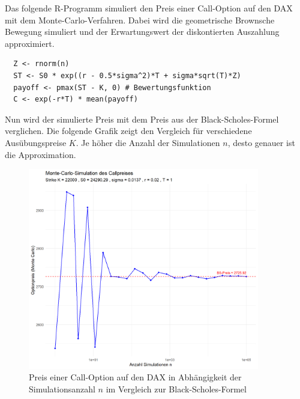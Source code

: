 \begin{bsp}

Das folgende R-Programm simuliert den Preis einer Call-Option auf den DAX
mit dem Monte-Carlo-Verfahren. Dabei wird die geometrische Brownsche Bewegung
simuliert und der Erwartungswert der diskontierten Auszahlung approximiert.

\begin{lstlisting}
  Z <- rnorm(n)
  ST <- S0 * exp((r - 0.5*sigma^2)*T + sigma*sqrt(T)*Z)
  payoff <- pmax(ST - K, 0) # Bewertungsfunktion
  C <- exp(-r*T) * mean(payoff)
\end{lstlisting}
Nun wird der simulierte Preis mit dem Preis aus der Black-Scholes-Formel verglichen. 
Die folgende Grafik zeigt den Vergleich für verschiedene Ausübungspreise $K$.
Je höher die Anzahl der Simulationen $n$, desto genauer ist die Approximation.

\begin{figure}[H]
    \centering
    \includegraphics[width=0.9\textwidth]{images/call_dax_mc.png}
    \caption{Preis einer Call-Option auf den DAX in Abhängigkeit der Simulationsanzahl $n$ im Vergleich zur Black-Scholes-Formel}
    \label{fig:call_dax_mc}
\end{figure}

\end{bsp}